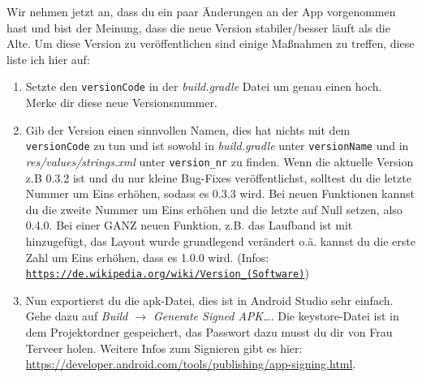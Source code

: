 \documentclass[12pt,headsepline]{scrartcl}
\begin{document}
Wir nehmen jetzt an, dass du ein paar Änderungen an der App vorgenommen hast und bist der Meinung, dass die neue Version stabiler/besser läuft als die Alte.
Um diese Version zu veröffentlichen sind einige Maßnahmen zu treffen, diese liste ich hier auf:
\begin{enumerate}
\item Setzte den \texttt{versionCode} in der \textit{build.gradle} Datei um genau einen hoch. Merke dir diese neue Versionsnummer.
\item Gib der Version einen sinnvollen Namen, dies hat nichts mit dem \texttt{versionCode} zu tun und ist sowohl in \textit{build.gradle} unter \texttt{versionName} und in \textit{res/values/strings.xml} unter \texttt{version\_nr} zu finden.
Wenn die aktuelle Version z.B 0.3.2 ist und du nur kleine Bug-Fixes veröffentlichst, solltest du die letzte Nummer um Eins erhöhen, sodass es 0.3.3 wird.
Bei neuen Funktionen kannst du die zweite Nummer um Eins erhöhen und die letzte auf Null setzen, also 0.4.0.
Bei einer GANZ neuen Funktion, z.B. das Laufband ist mit hinzugefügt, das Layout wurde grundlegend verändert o.ä. kannst du die erste Zahl um Eins erhöhen, dass es 1.0.0 wird.
(Infos: \href{https://de.wikipedia.org/wiki/Version_\%28Software\%29}{\texttt{https://de.wikipedia.org/wiki/Version\_(Software)}})
\item Nun exportierst du die apk-Datei, dies ist in Android Studio sehr einfach. Gehe dazu auf \textit{Build $\rightarrow$ Generate Signed APK\dots}.
Die keystore-Datei ist in dem Projektordner gespeichert, das Passwort dazu musst du dir von Frau Terveer holen.
Weitere Infos zum Signieren gibt es hier: \url{https://developer.android.com/tools/publishing/app-signing.html}.
 

\end{enumerate}
\end{document}

